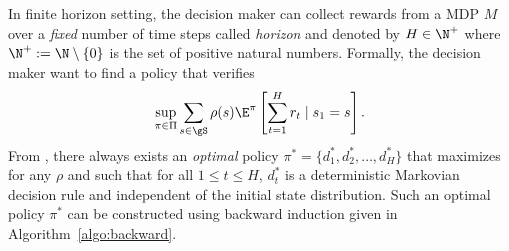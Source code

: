 In finite horizon setting, the decision maker can collect rewards from a MDP $M$ over a \emph{fixed} number of time steps called \emph{horizon} and denoted by $H\in\N^+$ where $\N^+:=\N\setminus\{0\}$ is the set of positive natural numbers.
Formally, the decision maker want to find a policy that verifies
\begin{equation}
    \label{eq:finite_obj}
    \sup_{\pi\in\Pi}\sum_{s\in\gS}\rho(s)\E^\pi\left[\sum_{t=1}^H r_t\mid s_1=s\right].
\end{equation}
From \cite[Chapter~4]{puterman2014markov}, there always exists an \emph{optimal} policy $\pi^*=\{d_1^*,d_2^*,\dots,d^*_H\}$ that maximizes  for any $\rho$ and such that for all $1\le t\le H$, $d_t^*$ is a deterministic Markovian decision rule and independent of the initial state distribution.
Such an optimal policy $\pi^*$ can be constructed using backward induction given in Algorithm~\ref{algo:backward}.

